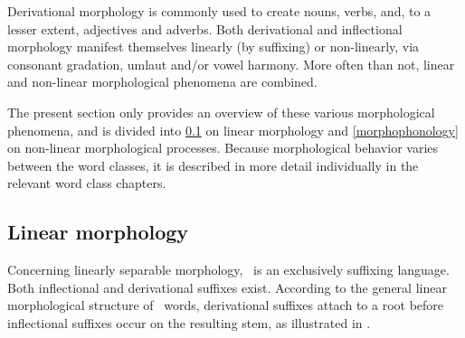 Derivational morphology is commonly used to create nouns, verbs, and, to a lesser extent, adjectives and adverbs. %
Both derivational and inflectional morphology manifest themselves linearly (by suffixing) or non-linearly, via consonant gradation, umlaut and/or vowel harmony. More often than not, linear and non-linear morphological phenomena are combined. 

The present section only provides an overview of these various morphological phenomena, and is divided into \SEC\ref{linearMorphology} on linear morphology and \SEC\ref{morphophonology} on non-linear morphological processes. %
Because morphological behavior varies between the word classes, it is described in more detail individually in the relevant word class chapters.  

\FB

\subsection{Linear morphology}\label{linearMorphology}
Concerning linearly separable morphology, \PS\ is an exclusively suffixing language. Both inflectional and derivational suffixes exist. %
According to the general linear morphological structure of \PS\ words, derivational suffixes attach to a root before inflectional suffixes occur on the resulting stem, as illustrated in .
\ea\label{linearMorphStructure}\z
{}

%


